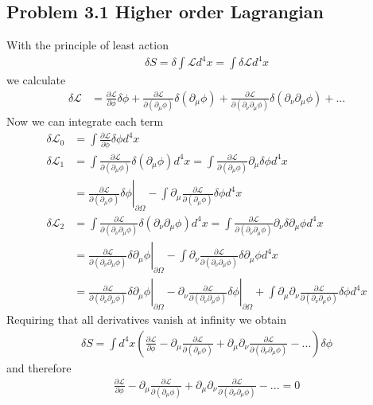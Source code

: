 \documentclass[10pt,a4paper]{book}
\theoremstyle{definition}
\begin{document}
\subsection{Problem 3.1 Higher order Lagrangian}
With the principle of least action
\begin{align}
\delta S=\delta\int\mathcal{L}d^4x=\int\delta\mathcal{L}d^4x
\end{align}
we calculate
\begin{align}
\delta\mathcal{L}
&=\frac{\partial \mathcal{L}}{\partial\phi}\delta\phi+
\frac{\partial \mathcal{L}}{\partial(\partial_\mu\phi)}\delta(\partial_\mu\phi)+
\frac{\partial \mathcal{L}}{\partial(\partial_\nu\partial_\mu\phi)}\delta(\partial_\nu\partial_\mu\phi)+...
\end{align}
Now we can integrate each term
\begin{align}
\delta\mathcal{L}_0&=\int \frac{\partial \mathcal{L}}{\partial\phi}\delta\phi d^4x\\
%
\delta\mathcal{L}_1&=\int \frac{\partial \mathcal{L}}{\partial(\partial_\mu\phi)}\delta(\partial_\mu\phi) d^4x
=\int \frac{\partial \mathcal{L}}{\partial(\partial_\mu\phi)}\partial_\mu\delta\phi d^4x\\
&=\left.\frac{\partial \mathcal{L}}{\partial(\partial_\mu\phi)}\delta\phi\right|_{\partial\Omega}-\int \partial_\mu\frac{\partial \mathcal{L}}{\partial(\partial_\mu\phi)}\delta\phi d^4x\\
%
\delta\mathcal{L}_2&=\int \frac{\partial \mathcal{L}}{\partial(\partial_\nu\partial_\mu\phi)}\delta(\partial_\nu\partial_\mu\phi) d^4x
=\int \frac{\partial \mathcal{L}}{\partial(\partial_\nu\partial_\mu\phi)}\partial_\nu\delta\partial_\mu\phi d^4x\\
&=\left.\frac{\partial \mathcal{L}}{\partial(\partial_\nu\partial_\mu\phi)}\delta\partial_\mu\phi\right|_{\partial\Omega}-\int \partial_\nu\frac{\partial \mathcal{L}}{\partial(\partial_\nu\partial_\mu\phi)}\delta\partial_\mu\phi d^4x\\
&=\left.\frac{\partial \mathcal{L}}{\partial(\partial_\nu\partial_\mu\phi)}\delta\partial_\mu\phi\right|_{\partial\Omega}-\left.\partial_\nu\frac{\partial \mathcal{L}}{\partial(\partial_\nu\partial_\mu\phi)}\delta\phi\right|_{\partial\Omega}+\int \partial_\mu\partial_\nu\frac{\partial \mathcal{L}}{\partial(\partial_\nu\partial_\mu\phi)}\delta\phi d^4x
\end{align}
Requiring that all derivatives vanish at infinity we obtain
\begin{align}
\delta S=\int d^4x\left(
\frac{\partial \mathcal{L}}{\partial\phi}
- \partial_\mu\frac{\partial \mathcal{L}}{\partial(\partial_\mu\phi)}
+\partial_\mu\partial_\nu\frac{\partial \mathcal{L}}{\partial(\partial_\nu\partial_\mu\phi)}-...
\right)\delta\phi
\end{align}
and therefore
\begin{align}
\frac{\partial \mathcal{L}}{\partial\phi}
- \partial_\mu\frac{\partial \mathcal{L}}{\partial(\partial_\mu\phi)}
+\partial_\mu\partial_\nu\frac{\partial \mathcal{L}}{\partial(\partial_\nu\partial_\mu\phi)}-...=0
\end{align}
\end{document}
